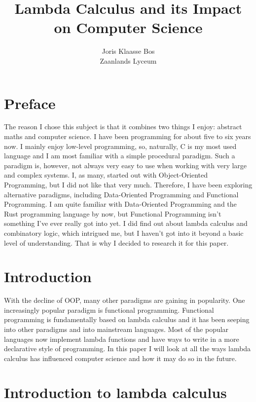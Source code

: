 \documentclass[11pt]{article}
\title{Lambda Calculus and its Impact on Computer Science}
\author{Joris Klaasse Bos\\ Zaanlands Lyceum}
\begin{document}
\maketitle
\newpage
\tableofcontents
\newpage


\section{Preface}


The reason I chose this subject is that it combines two things I enjoy:
abstract maths and computer science. I have been programming for about five to
six years now. I mainly enjoy low-level programming, so, naturally, C is my
most used language and I am most familiar with a simple procedural paradigm.
Such a paradigm is, however, not always very easy to use when working with very
large and complex systems. I, as many, started out with Object-Oriented
Programming, but I did not like that very much. Therefore, I have been
exploring alternative paradigms, including Data-Oriented Programming and
Functional Programming. I am quite familiar with Data-Oriented Programming and
the Rust programming language by now, but Functional Programming isn't
something I've ever really got into yet. I did find out about lambda calculus
and combinatory logic, which intrigued me, but I haven’t got into it beyond a
basic level of understanding. That is why I decided to research it for this
paper. 

\section{Introduction}

With the decline of OOP, many other paradigms are gaining in popularity. One
increasingly popular paradigm is functional programming. Functional programming
is fundamentally based on lambda calculus and it has been seeping into other
paradigms and into mainstream languages. Most of the popular languages now
implement lambda functions and have ways to write in a more declarative style
of programming. In this paper I will look at all the ways lambda calculus has
influenced computer science and how it may do so in the future.

\section{Introduction to lambda calculus}
\end{document}

